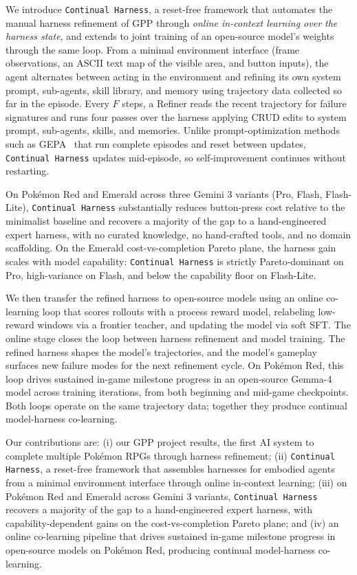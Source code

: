 \documentclass[11pt]{article}
\begin{document}
We introduce \texttt{Continual Harness}, a reset-free framework that automates the manual harness refinement of GPP through \emph{online in-context learning over the harness state}, and extends to joint training of an open-source model's weights through the same loop. From a minimal environment interface (frame observations, an ASCII text map of the visible area, and button inputs), the agent alternates between acting in the environment and refining its own system prompt, sub-agents, skill library, and memory using trajectory data collected so far in the episode. Every $F$ steps, a Refiner reads the recent trajectory for failure signatures and runs four passes over the harness applying CRUD edits to system prompt, sub-agents, skills, and memories. Unlike prompt-optimization methods such as GEPA~\citep{agrawal2025gepa} that run complete episodes and reset between updates, \texttt{Continual Harness} updates mid-episode, so self-improvement continues without restarting.

On Pok\'{e}mon Red and Emerald across three Gemini 3 variants (Pro, Flash, Flash-Lite), \texttt{Continual Harness} substantially reduces button-press cost relative to the minimalist baseline and recovers a majority of the gap to a hand-engineered expert harness, with no curated knowledge, no hand-crafted tools, and no domain scaffolding. On the Emerald cost-vs-completion Pareto plane, the harness gain scales with model capability: \texttt{Continual Harness} is strictly Pareto-dominant on Pro, high-variance on Flash, and below the capability floor on Flash-Lite.

We then transfer the refined harness to open-source models using an online co-learning loop that scores rollouts with a process reward model, relabeling low-reward windows via a frontier teacher, and updating the model via soft SFT. The online stage closes the loop between harness refinement and model training. The refined harness shapes the model's trajectories, and the model's gameplay surfaces new failure modes for the next refinement cycle. On Pok\'{e}mon Red, this loop drives sustained in-game milestone progress in an open-source Gemma-4 model across training iterations, from both beginning and mid-game checkpoints. Both loops operate on the same trajectory data; together they produce continual model-harness co-learning.

Our contributions are: (i) our GPP project results, the first AI system to complete multiple Pok\'{e}mon RPGs through harness refinement; (ii) \texttt{Continual Harness}, a reset-free framework that assembles harnesses for embodied agents from a minimal environment interface through online in-context learning; (iii) on Pok\'{e}mon Red and Emerald across Gemini 3 variants, \texttt{Continual Harness} recovers a majority of the gap to a hand-engineered expert harness, with capability-dependent gains on the cost-vs-completion Pareto plane; and (iv) an online co-learning pipeline that drives sustained in-game milestone progress in open-source models on Pok\'{e}mon Red, producing continual model-harness co-learning.
\end{document}
